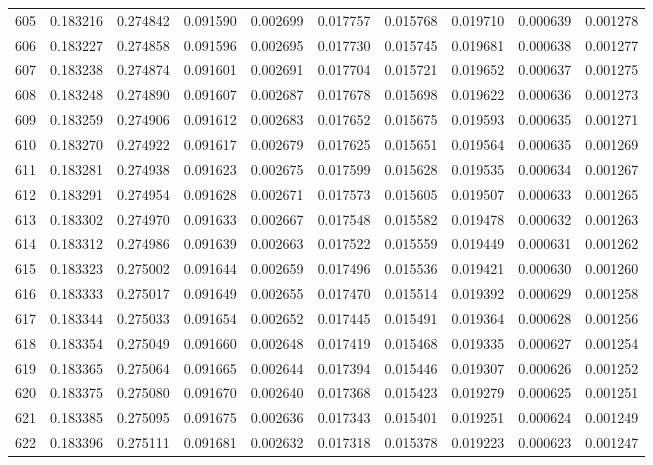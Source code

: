 \begin{tabular}{lrrrrrrrrr}
605 & 0.183216 & 0.274842 & 0.091590 & 0.002699 & 0.017757 & 0.015768 & 0.019710 & 0.000639 & 0.001278 \\
606 & 0.183227 & 0.274858 & 0.091596 & 0.002695 & 0.017730 & 0.015745 & 0.019681 & 0.000638 & 0.001277 \\
607 & 0.183238 & 0.274874 & 0.091601 & 0.002691 & 0.017704 & 0.015721 & 0.019652 & 0.000637 & 0.001275 \\
608 & 0.183248 & 0.274890 & 0.091607 & 0.002687 & 0.017678 & 0.015698 & 0.019622 & 0.000636 & 0.001273 \\
609 & 0.183259 & 0.274906 & 0.091612 & 0.002683 & 0.017652 & 0.015675 & 0.019593 & 0.000635 & 0.001271 \\
610 & 0.183270 & 0.274922 & 0.091617 & 0.002679 & 0.017625 & 0.015651 & 0.019564 & 0.000635 & 0.001269 \\
611 & 0.183281 & 0.274938 & 0.091623 & 0.002675 & 0.017599 & 0.015628 & 0.019535 & 0.000634 & 0.001267 \\
612 & 0.183291 & 0.274954 & 0.091628 & 0.002671 & 0.017573 & 0.015605 & 0.019507 & 0.000633 & 0.001265 \\
613 & 0.183302 & 0.274970 & 0.091633 & 0.002667 & 0.017548 & 0.015582 & 0.019478 & 0.000632 & 0.001263 \\
614 & 0.183312 & 0.274986 & 0.091639 & 0.002663 & 0.017522 & 0.015559 & 0.019449 & 0.000631 & 0.001262 \\
615 & 0.183323 & 0.275002 & 0.091644 & 0.002659 & 0.017496 & 0.015536 & 0.019421 & 0.000630 & 0.001260 \\
616 & 0.183333 & 0.275017 & 0.091649 & 0.002655 & 0.017470 & 0.015514 & 0.019392 & 0.000629 & 0.001258 \\
617 & 0.183344 & 0.275033 & 0.091654 & 0.002652 & 0.017445 & 0.015491 & 0.019364 & 0.000628 & 0.001256 \\
618 & 0.183354 & 0.275049 & 0.091660 & 0.002648 & 0.017419 & 0.015468 & 0.019335 & 0.000627 & 0.001254 \\
619 & 0.183365 & 0.275064 & 0.091665 & 0.002644 & 0.017394 & 0.015446 & 0.019307 & 0.000626 & 0.001252 \\
620 & 0.183375 & 0.275080 & 0.091670 & 0.002640 & 0.017368 & 0.015423 & 0.019279 & 0.000625 & 0.001251 \\
621 & 0.183385 & 0.275095 & 0.091675 & 0.002636 & 0.017343 & 0.015401 & 0.019251 & 0.000624 & 0.001249 \\
622 & 0.183396 & 0.275111 & 0.091681 & 0.002632 & 0.017318 & 0.015378 & 0.019223 & 0.000623 & 0.001247 \\

\end{tabular}
